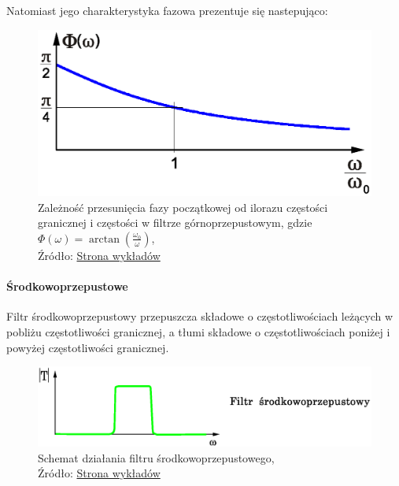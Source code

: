 \documentclass{article}
\begin{document}
            Natomiast jego charakterystyka fazowa prezentuje się nastepująco:
            \begin{figure}[!ht]
              \centering
              \includegraphics[scale=0.45]{grafiki/Cr_Phase.eps}
              \caption{Zależność przesunięcia fazy początkowej od ilorazu częstości granicznej i częstości w filtrze górnoprzepustowym, gdzie $\varPhi(\omega) = \arctan(\frac{\omega_0}{\omega})$,
              \\Źródło: \href{https://spe.if.uj.edu.pl/literatura}{Strona wykładów}}
            \end{figure}

          \paragraph{Środkowoprzepustowe}
            \mbox{}\newline
            Filtr środkowoprzepustowy przepuszcza składowe o częstotliwościach leżących w pobliżu częstotliwości granicznej, a tłumi składowe o częstotliwościach poniżej i powyżej częstotliwości granicznej.

            \begin{figure}[!ht]
              \centering
              \includegraphics[scale=0.35]{grafiki/srodkowoprzepustowy.eps}
              \caption{Schemat działania filtru środkowoprzepustowego,
              \\Źródło: \href{https://spe.if.uj.edu.pl/literatura}{Strona wykładów}}
            \end{figure}
\end{document}
